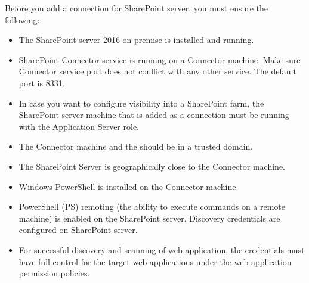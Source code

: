 \documentclass[letterpaper,10pt,english]{sphinxmanual}
\begin{document}
Before you add a connection for SharePoint server, you must ensure the following:
\begin{itemize}
\item {} 
The SharePoint server 2016 on premise is installed and running.

\item {} 
SharePoint Connector service is running on a Connector machine. Make sure Connector service port does not conflict with any other service. The default port is 8331.

\item {} 
In case you want to configure visibility into a SharePoint farm, the SharePoint server machine that is added as a connection must be running with the Application Server role.

\item {} 
The Connector machine and the should be in a trusted domain.

\item {} 
The SharePoint Server is geographically close to the Connector machine.

\item {} 
Windows PowerShell is installed on the Connector machine.

\item {} 
PowerShell (PS) remoting (the ability to execute commands on a remote machine) is enabled on the SharePoint server. Discovery credentials are configured on SharePoint server.

\item {} 
For successful discovery and scanning of web application, the credentials must have full control for the target web applications under the web application permission policies.

\end{itemize}
\end{document}
